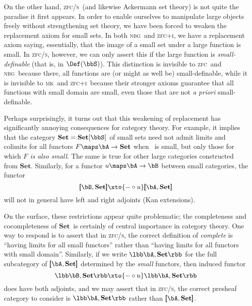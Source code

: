 \documentclass{amsart}
\newcommand{\Set}{\ensuremath{\mathbf{Set}}}
\def\zfc{\textsc{zfc}}
\def\zfci{\textsc{zfc+i}}
\def\zfcs{\textsc{zfc/s}}
\def\nbg{\textsc{nbg}}
\def\mk{\textsc{mk}}
\begin{document}
On the other hand, \zfcs\ (and likewise Ackermann set theory) is not
quite the paradise it first appears.  In order to enable ourselves to
manipulate large objects freely without strengthening set theory, we
have been forced to weaken the replacement axiom for small sets.  In
both \nbg\ and \zfci, we have a replacement axiom saying, essentially,
that the image of a small set under a large function is small.  In
\zfcs, however, we can only assert this if the large function is
\emph{small-definable} (that is, in $\Def(\bbS)$).  This distinction
is invisible to \zfc\ and \nbg\ because there, all functions are (or
might as well be) small-definable, while it is invisible to \mk\ and
\zfci\ because their stronger axioms guarantee that all functions with
small domain are small, even those that are not \emph{a priori}
small-definable.

Perhaps surprisingly, it turns out that this weakening of replacement
has significantly annoying consequences for category theory.  For
example, it implies that the category $\Set=\Set[\bbS]$ of small sets
need not admit limits and colimits for all functors $F\maps \bA\to
\Set$ when \bA\ is small, but only those for which \emph{$F$ is also
  small}.  The same is true for other large categories constructed
from \Set.  Similarly, for a functor $u\maps \bA\to\bB$ between small
categories, the functor
\[\pmb[\bB,\Set\pmb] \xto{-\circ u} \pmb[\bA,\Set\pmb]
\]
will not in general have left and right adjoints (Kan extensions).

On the surface, these restrictions appear quite problematic; the
completeness and cocompleteness of \Set\ is certainly of central
importance in category theory.  One way to respond is to assert that
in \zfcs, the correct definition of \emph{complete} is ``having limits
for all small functors'' rather than ``having limits for all functors
with small domain''.  Similarly, if we write $\lbb\bA,\Set\rbb$ for
the full subcategory of $\pmb[\bA,\Set\pmb]$ determined by the
\emph{small} functors, then induced functor
\[\lbb\bB,\Set\rbb \xto{-\circ u} \lbb\bA,\Set\rbb
\]
does have both adjoints, and we may assert that in \zfcs, the correct
presheaf category to consider is $\lbb\bA,\Set\rbb$ rather than
$\pmb[\bA,\Set\pmb]$.
\end{document}
